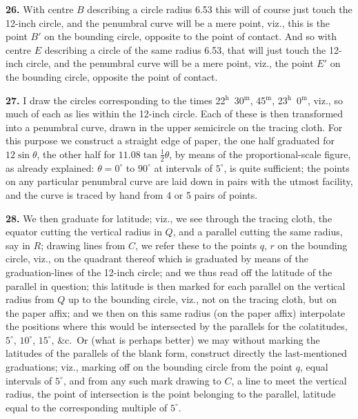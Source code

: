 \documentclass[11pt,a4paper]{article}
\begin{document}
\noindent\textbf{26.} With centre $B$ describing a circle radius 6.53 this will of course just touch the 12-inch circle, and the penumbral curve will be a mere point, viz., this is the point $B'$ on the bounding circle, opposite to the point of contact. And so with centre $E$ describing a circle of the same radius 6.53, that will just touch the 12-inch circle, and the penumbral curve will be a mere point, viz., the point $E'$ on the bounding circle, opposite the point of contact.

\noindent\textbf{27.} I draw the circles corresponding to the times 22$^{\text{h}}$\ 30$^{\text{m}}$, 45$^{\text{m}}$, 23$^{\text{h}}$\ 0$^{\text{m}}$, viz., so much of each as lies within the 12-inch circle. Each of these is then transformed into a penumbral curve, drawn in the upper semicircle on the tracing cloth. For this purpose we construct a straight edge of paper, the one half graduated for $12 \sin \theta$, the other half for $11.08 \tan \tfrac{1}{2}\theta$, by means of the proportional-scale figure, as already explained: $\theta = 0^{\circ}$ to $90^{\circ}$ at intervals of $5^{\circ}$, is quite sufficient; the points on any particular penumbral curve are laid down in pairs with the utmost facility, and the curve is traced by hand from 4 or 5 pairs of points.

\noindent\textbf{28.} We then graduate for latitude; viz., we see through the tracing cloth, the equator cutting the vertical radius in $Q$, and a parallel cutting the same radius, say in $R$; drawing lines from $C$, we refer these to the points $q$, $r$ on the bounding circle, viz., on the quadrant thereof which is graduated by means of the graduation-lines of the 12-inch circle; and we thus read off the latitude of the parallel in question; this latitude is then marked for each parallel on the vertical radius from $Q$ up to the bounding circle, viz., not on the tracing cloth, but on the paper affix; and we then on this same radius (on the paper affix) interpolate the positions where this would be intersected by the parallels for the colatitudes, $5^{\circ}$, $10^{\circ}$, $15^{\circ}$, \&c.\ Or (what is perhaps better) we may without marking the latitudes of the parallels of the blank form, construct directly the last-mentioned graduations; viz., marking off on the bounding circle from the point $q$, equal intervals of $5^{\circ}$, and from any such mark drawing to $C$, a line to meet the vertical radius, the point of intersection is the point belonging to the parallel, latitude equal to the corresponding multiple of $5^{\circ}$.
\end{document}
